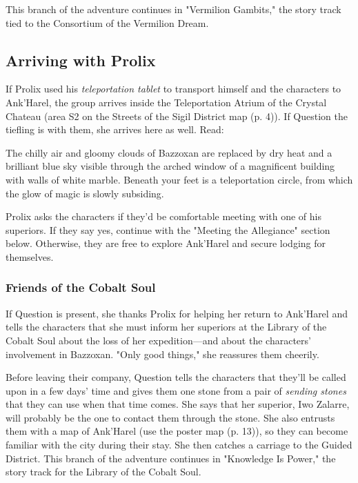\documentclass[a4paper, 11pt, bg=full, twocolumn, nooutline]{dndbook}
\begin{document}
This branch of the adventure continues in "Vermilion Gambits," the story track tied to the Consortium of the Vermilion Dream.

\subsection{Arriving with Prolix}

If Prolix used his \textit{teleportation tablet} to transport himself and the characters to Ank'Harel, the group arrives inside the Teleportation Atrium of the Crystal Chateau (area S2 on the Streets of the Sigil District map (p. 4)). If Question the tiefling is with them, she arrives here as well. Read:

\begin{DndReadAloud}
The chilly air and gloomy clouds of Bazzoxan are replaced by dry heat and a brilliant blue sky visible through the arched window of a magnificent building with walls of white marble. Beneath your feet is a teleportation circle, from which the glow of magic is slowly subsiding.
\end{DndReadAloud}

Prolix asks the characters if they'd be comfortable meeting with one of his superiors. If they say yes, continue with the "Meeting the Allegiance" section below. Otherwise, they are free to explore Ank'Harel and secure lodging for themselves.

\subsubsection{Friends of the Cobalt Soul}

If Question is present, she thanks Prolix for helping her return to Ank'Harel and tells the characters that she must inform her superiors at the Library of the Cobalt Soul about the loss of her expedition---and about the characters' involvement in Bazzoxan. "Only good things," she reassures them cheerily.

Before leaving their company, Question tells the characters that they'll be called upon in a few days' time and gives them one stone from a pair of \textit{sending stones} that they can use when that time comes. She says that her superior, Iwo Zalarre, will probably be the one to contact them through the stone. She also entrusts them with a map of Ank'Harel (use the poster map (p. 13)), so they can become familiar with the city during their stay. She then catches a carriage to the Guided District. This branch of the adventure continues in "Knowledge Is Power," the story track for the Library of the Cobalt Soul.
\end{document}
